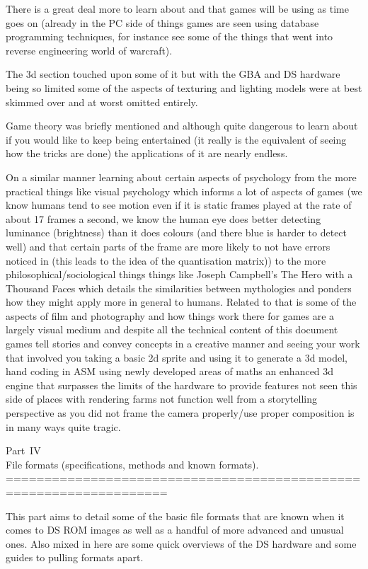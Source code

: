 \documentclass[
]{book}
\begin{document}
There is a great deal more to learn about and that games will be using as time goes on (already in the PC side of things games are seen using database programming techniques, for instance see some of the things that went into reverse engineering world of warcraft).

The 3d section touched upon some of it but with the GBA and DS hardware being so limited some of the aspects of texturing and lighting models were at best skimmed over and at worst omitted entirely.

Game theory was briefly mentioned and although quite dangerous to learn about if you would like to keep being entertained (it really is the equivalent of seeing how the tricks are done) the applications of it are nearly endless.

On a similar manner learning about certain aspects of psychology from the more practical things like visual psychology which informs a lot of aspects of games (we know humans tend to see motion even if it is static frames played at the rate of about 17 frames a second, we know the human eye does better detecting luminance (brightness) than it does colours (and there blue is harder to detect well) and that certain parts of the frame are more likely to not have errors noticed in (this leads to the idea of the quantisation matrix)) to the more philosophical/sociological things things like Joseph Campbell's The Hero with a Thousand Faces which details the similarities between mythologies and ponders how they might apply more in general to humans. Related to that is some of the aspects of film and photography and how things work there for games are a largely visual medium and despite all the technical content of this document games tell stories and convey concepts in a creative manner and seeing your work that involved you taking a basic 2d sprite and using it to generate a 3d model, hand coding in ASM using newly developed areas of maths an enhanced 3d engine that surpasses the limits of the hardware to provide features not seen this side of places with rendering farms not function well from a storytelling perspective as you did not frame the camera properly/use proper composition is in many ways quite tragic.

Part~IV\\
File formats (specifications, methods and known formats).
===================================================================

This part aims to detail some of the basic file formats that are known when it comes to DS ROM images as well as a handful of more advanced and unusual ones. Also mixed in here are some quick overviews of the DS hardware and some guides to pulling formats apart.
\end{document}
